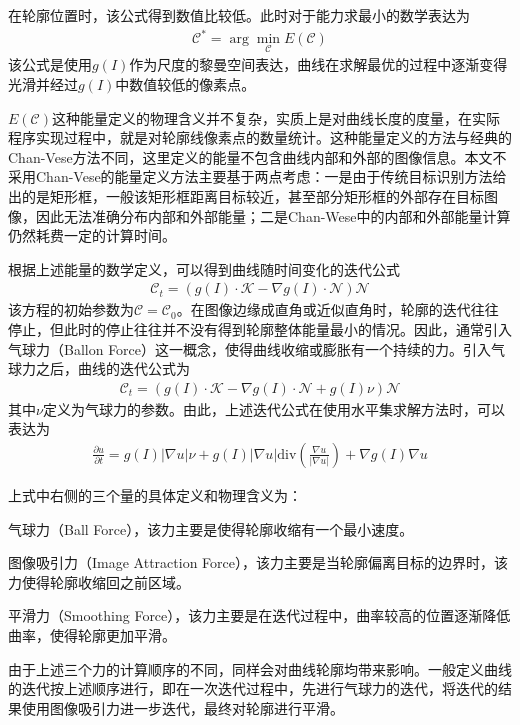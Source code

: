 在轮廓位置时，该公式得到数值比较低。此时对于能力求最小的数学表达为
\begin{align}
\mathcal{C}^*=\arg \min_\mathcal{C} E(\mathcal{C})
\end{align}
该公式是使用$g(I)$作为尺度的黎曼空间表达，曲线在求解最优的过程中逐渐变得光滑并经过$g(I)$中数值较低的像素点。

$E(\mathcal{C})$这种能量定义的物理含义并不复杂，实质上是对曲线长度的度量，在实际程序实现过程中，就是对轮廓线像素点的数量统计。这种能量定义的方法与经典的Chan-Vese方法\cite{Chan2001}不同，这里定义的能量不包含曲线内部和外部的图像信息。本文不采用Chan-Vese的能量定义方法主要基于两点考虑：一是由于传统目标识别方法给出的是矩形框，一般该矩形框距离目标较近，甚至部分矩形框的外部存在目标图像，因此无法准确分布内部和外部能量；二是Chan-Wese中的内部和外部能量计算仍然耗费一定的计算时间。

根据上述能量的数学定义，可以得到曲线随时间变化的迭代公式
\begin{align}
\mathcal{C}_t=(g(I)\cdot \mathcal{K}-\nabla g(I)\cdot\mathcal{N})\mathcal{N}
\end{align}
该方程的初始参数为$\mathcal{C}=\mathcal{C}_0$。在图像边缘成直角或近似直角时，轮廓的迭代往往停止，但此时的停止往往并不没有得到轮廓整体能量最小的情况。因此，通常引入气球力（Ballon Force）这一概念，使得曲线收缩或膨胀有一个持续的力。引入气球力之后，曲线的迭代公式为
\begin{align}
\mathcal{C}_t=(g(I)\cdot \mathcal{K}-\nabla g(I)\cdot\mathcal{N}+g(I) \nu)\mathcal{N}
\end{align}
其中$\nu$定义为气球力的参数。由此，上述迭代公式在使用水平集求解方法时，可以表达为
\begin{align}
\frac{\partial u}{\partial t} = g(I)|\nabla u|\nu +g(I) |\nabla u|\text{div}(\frac{\nabla u}{|\nabla u|}) + \nabla g(I) \nabla u
\end{align}

上式中右侧的三个量的具体定义和物理含义为：
\begin{compactenum}
\item 气球力（Ball Force），该力主要是使得轮廓收缩有一个最小速度。\item 图像吸引力（Image Attraction Force），该力主要是当轮廓偏离目标的边界时，该力使得轮廓收缩回之前区域。\item 平滑力（Smoothing Force），该力主要是在迭代过程中，曲率较高的位置逐渐降低曲率，使得轮廓更加平滑。
\end{compactenum}

由于上述三个力的计算顺序的不同，同样会对曲线轮廓均带来影响。一般定义曲线的迭代按上述顺序进行，即在一次迭代过程中，先进行气球力的迭代，将迭代的结果使用图像吸引力进一步迭代，最终对轮廓进行平滑。

